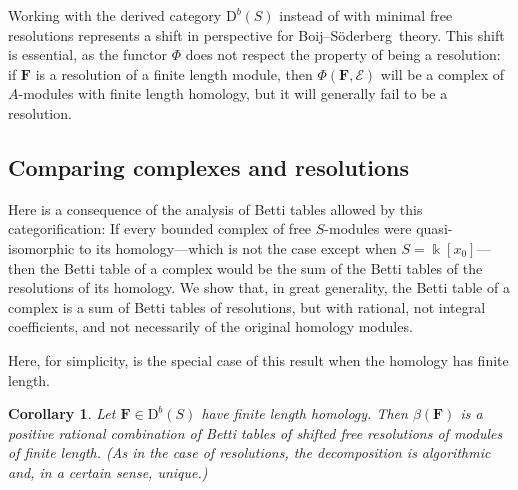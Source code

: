 \documentclass[12pt]{amsart}
\newtheorem{cor}[lemma]{Corollary}
\theoremstyle{definition}
\theoremstyle{remark}
\newcommand{\kk}{\Bbbk}
\newcommand{\codim}{\operatorname{codim}}
\newcommand{\cE}{\mathcal{E}}
\newcommand{\FF}{\mathbf{F}}
\newcommand{\subsecNTOC}[1]{\noindent{\bf{#1}}} %
\newcommand{\DD}{\mathrm{D}}
\def\BS{Boij--S\"oderberg~}
\begin{document}
Working with the derived category $\DD^b(S)$ instead of with minimal free resolutions represents a shift in perspective for \BS theory.  This shift is essential, as the functor $\Phi$ does not respect the property of being a resolution: if $\FF$ is a resolution of a finite length module, then $\Phi(\FF,\cE)$ will be a complex of $A$-modules with finite length homology, but it will generally fail to be a resolution.  


\subsection*{Comparing complexes and resolutions}
Here is a consequence of the analysis of Betti tables allowed by this categorification: If every bounded complex of free $S$-modules were quasi-isomorphic to its homology---which is not the case except when $S=\kk[x_0]$---then the Betti table of a complex would be the sum of the Betti tables of the resolutions of its homology.  We show that, in great generality, the Betti table of a complex is a sum of Betti tables of resolutions, but with rational, not integral coefficients, and not necessarily of the original homology modules. 

Here, for simplicity, is the special case of this result when the homology has finite length. 
%
\begin{cor}\label{cor:decompose}
Let $\FF\in \DD^b(S)$ have finite length homology.  Then $\beta(\FF)$ is a positive rational combination of Betti tables of shifted free resolutions of modules of finite length. (As in the case of resolutions, the decomposition is algorithmic and, in a certain sense, unique.)
\end{cor}
\end{document}
